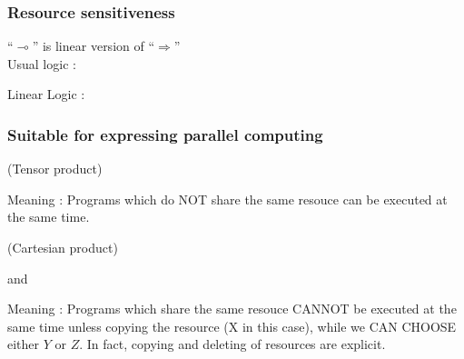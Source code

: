 \documentclass[dvipdfmx,cjk]{beamer}
\theoremstyle{example}
\begin{document}
\begin{frame}
  \frametitle{Resource sensitiveness} 

  ``$\multimap$'' is linear version of ``$\Rightarrow$'' \\

  Usual logic :
  \begin{prooftree}
  \end{prooftree} 

  Linear Logic :
  \begin{prooftree}
  \end{prooftree}

\end{frame}

\begin{frame}
  \frametitle{Suitable for expressing parallel computing} 

  \otimes (Tensor product)

  \begin{prooftree}

    
  \end{prooftree} 

  Meaning : Programs which do NOT share the same resouce can be executed
  at the same time.

\end{frame}

\begin{frame}
  \with (Cartesian product)
  
  \begin{prooftree}

    
  \end{prooftree}

  and

  \begin{prooftree}

    
  \end{prooftree}

  Meaning : Programs which share the same resouce CANNOT be executed
  at the same time unless copying the resource (X in this case),
  while we CAN CHOOSE either $Y$ or $Z$.
  In fact, copying and deleting of resources are explicit.

\end{frame}
\end{document}

